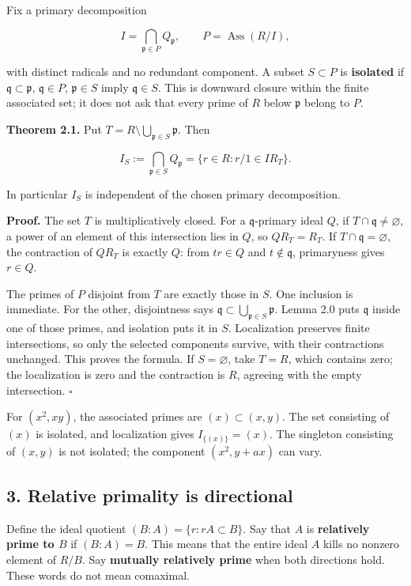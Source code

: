 \documentclass[
]{article}
\begin{document}
Fix a primary decomposition

\[
I=\bigcap_{\mathfrak p\in P}Q_{\mathfrak p},
\qquad P=\operatorname{Ass}(R/I),
\]

with distinct radicals and no redundant component. A subset
\(S\subset P\) is \textbf{isolated} if
\(\mathfrak q\subset\mathfrak p\), \(\mathfrak q\in P\),
\(\mathfrak p\in S\) imply \(\mathfrak q\in S\). This is downward
closure within the finite associated set; it does not ask that every
prime of \(R\) below \(\mathfrak p\) belong to \(P\).

\textbf{Theorem 2.1.} Put
\(T=R\setminus\bigcup_{\mathfrak p\in S}\mathfrak p\). Then

\[
I_S:=\bigcap_{\mathfrak p\in S}Q_{\mathfrak p}
=\{r\in R:r/1\in I R_T\}.
\]

In particular \(I_S\) is independent of the chosen primary
decomposition.

\textbf{Proof.} The set \(T\) is multiplicatively closed. For a
\(\mathfrak q\)-primary ideal \(Q\), if
\(T\cap\mathfrak q\ne\varnothing\), a power of an element of this
intersection lies in \(Q\), so \(QR_T=R_T\). If
\(T\cap\mathfrak q=\varnothing\), the contraction of \(QR_T\) is exactly
\(Q\): from \(tr\in Q\) and \(t\notin\mathfrak q\), primaryness gives
\(r\in Q\).

The primes of \(P\) disjoint from \(T\) are exactly those in \(S\). One
inclusion is immediate. For the other, disjointness says
\(\mathfrak q\subset\bigcup_{\mathfrak p\in S}\mathfrak p\). Lemma 2.0
puts \(\mathfrak q\) inside one of those primes, and isolation puts it
in \(S\). Localization preserves finite intersections, so only the
selected components survive, with their contractions unchanged. This
proves the formula. If \(S=\varnothing\), take \(T=R\), which contains
zero; the localization is zero and the contraction is \(R\), agreeing
with the empty intersection. \(\square\)

For \((x^2,xy)\), the associated primes are \((x)\subset(x,y)\). The set
consisting of \((x)\) is isolated, and localization gives
\(I_{\{(x)\}}=(x)\). The singleton consisting of \((x,y)\) is not
isolated; the component \((x^2,y+ax)\) can vary.

\subsection{3. Relative primality is
directional}\label{relative-primality-is-directional}

Define the ideal quotient \((B:A)=\{r:rA\subset B\}\). Say that \(A\) is
\textbf{relatively prime to \(B\)} if \((B:A)=B\). This means that the
entire ideal \(A\) kills no nonzero element of \(R/B\). Say
\textbf{mutually relatively prime} when both directions hold. These
words do not mean comaximal.
\end{document}
